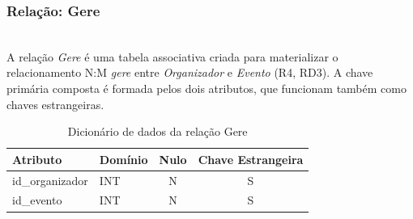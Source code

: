 \documentclass[runningheads]{llncs}
\begin{document}
                \vspace{0.3cm}
                \noindent\begin{minipage}{\textwidth}
                \subsubsection{Relação: Gere}\mbox{}\\

                A relação \textit{Gere} é uma tabela associativa criada para materializar o
                relacionamento N:M \textit{gere} entre \textit{Organizador} e \textit{Evento}
                (R4, RD3). A chave primária composta é formada pelos dois atributos, que
                funcionam também como chaves estrangeiras.

                \begin{table}[H]
                \centering
                \renewcommand{\arraystretch}{1.4}
                \begin{tabular}{|l|l|c|c|}
                \hline
                \textbf{Atributo} & \textbf{Domínio} & \textbf{Nulo} & \textbf{Chave Estrangeira} \\ \hline
                id\_organizador & INT & N & S \\ \hline
                id\_evento      & INT & N & S \\ \hline
                \end{tabular}
                \vspace{0.2cm}
                \caption{Dicionário de dados da relação Gere}
                \label{tab:dic_gere}
                \end{table}
                \end{minipage}
\end{document}

